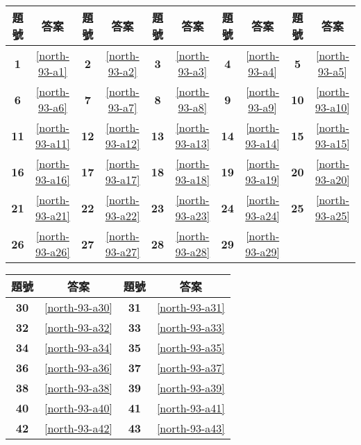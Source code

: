 \documentclass[12pt,a4paper]{report}
\begin{document}
\begin{CJK}{UTF8}{bkai}
\begin{table}[h]
  \center
  \begin{tabular}{|c|c|c|c|c|c|c|c|c|c|}
  \hline
  題號 & 答案 & 題號 & 答案 & 題號 & 答案 & 題號 & 答案 & 題號 & 答案\\
  \hline\hline
  \textbf{1}  & \ref{north-93-a1} & \textbf{2}  & \ref{north-93-a2} & \textbf{3}  & \ref{north-93-a3} & \textbf{4}  & \ref{north-93-a4} & \textbf{5}  & \ref{north-93-a5}\\
  \hline
  \textbf{6}  & \ref{north-93-a6} & \textbf{7}  & \ref{north-93-a7} & \textbf{8}  & \ref{north-93-a8} & \textbf{9}  & \ref{north-93-a9} & \textbf{10} & \ref{north-93-a10}\\
  \hline
  \textbf{11} & \ref{north-93-a11} & \textbf{12} & \ref{north-93-a12} & \textbf{13} & \ref{north-93-a13} & \textbf{14} & \ref{north-93-a14} & \textbf{15} & \ref{north-93-a15}\\
  \hline
  \textbf{16} & \ref{north-93-a16} & \textbf{17} & \ref{north-93-a17} & \textbf{18} & \ref{north-93-a18} & \textbf{19} & \ref{north-93-a19} & \textbf{20} & \ref{north-93-a20}\\
  \hline
  \textbf{21} & \ref{north-93-a21} & \textbf{22} & \ref{north-93-a22} & \textbf{23} & \ref{north-93-a23} & \textbf{24} & \ref{north-93-a24} & \textbf{25} & \ref{north-93-a25}\\
  \hline
  \textbf{26} & \ref{north-93-a26} & \textbf{27} & \ref{north-93-a27} & \textbf{28} & \ref{north-93-a28} & \textbf{29} & \ref{north-93-a29} & &\\
  \hline
  \end{tabular}
\end{table}

\begin{table}[h]
  \center
  \begin{tabular}{|c|c|c|c|}
  \hline
  題號 & 答案 & 題號 & 答案\\
  \hline\hline
  \textbf{30} & \ref{north-93-a30} & \textbf{31} & \ref{north-93-a31}\\
  \hline
  \textbf{32} & \ref{north-93-a32} & \textbf{33} & \ref{north-93-a33}\\
  \hline
  \textbf{34} & \ref{north-93-a34} & \textbf{35} & \ref{north-93-a35}\\
  \hline
  \textbf{36} & \ref{north-93-a36} & \textbf{37} & \ref{north-93-a37}\\
  \hline
  \textbf{38} & \ref{north-93-a38} & \textbf{39} & \ref{north-93-a39}\\
  \hline
  \textbf{40} & \ref{north-93-a40} & \textbf{41} & \ref{north-93-a41}\\
  \hline
  \textbf{42} & \ref{north-93-a42} & \textbf{43} & \ref{north-93-a43}\\
  \hline
  \end{tabular}
\end{table}

\end{CJK}
\end{document}
